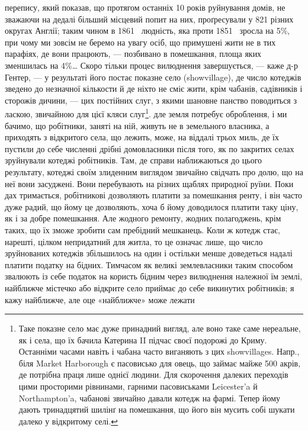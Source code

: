 перепису, який показав, що протягом останніх 10 років руйнування
домів, не зважаючи на дедалі більший місцевий попит на
них, проґресували у 821 різних округах Англії; таким чином в
1861~ людність, яка проти 1851~ зросла на 5\%, при чому
ми зовсім не беремо на увагу осіб, що примушені жити не в тих
парафіях, де вони працюють, — позбивано в помешкання, площа
яких зменшилась на 4\%\dots{} Скоро тільки процес вилюднення
завершується, — каже д-р Гентер, — у результаті його постає
показне село (showvillage), де число котеджів зведено до незначної
кількости й де ніхто не сміє жити, крім чабанів, садівників
і сторожів дичини, — цих постійних слуг, з якими шановне панство
поводиться з ласкою, звичайною для цієї кляси слуг\footnote{
Таке показне село має дуже принадний вигляд, але воно таке
саме нереальне, як і села, що їх бачила Катерина II підчас своєї подорожі
до Криму. Останніми часами навіть і чабана часто виганяють з цих showvillages.
Напр., біля Market Harborough є пасовисько для овець, що
займає майже 500 акрів, де потрібна праця лише однієї людини. Для скорочення
далеких переходів цими просторими рівнинами, гарними пасовиськами
Leicester’a й Northampton’a, чабанові звичайно давали котедж
на фармі. Тепер йому дають тринадцятий шилінґ на помешкання, що його
він мусить собі шукати далеко у відкритому селі.
}.
дле земля потребує оброблення, і ми бачимо, що робітники,
заняті на ній, живуть не в земельного власника, а приходять з
відкритого села, що лежить, може, на віддалі трьох миль, де
їх пустили до себе численні дрібні домовласники після того, як
по закритих селах зруйнували котеджі робітників. Там, де справи
наближаються до цього результату, котеджі своїм злиденним
виглядом звичайно свідчать про долю, що на неї вони засуджені.
Вони перебувають на різних щаблях природної руїни. Поки
дах тримається, робітникові дозволяють платити за помешкання
ренту, і він часто дуже радий, що йому це дозволяють, хоча б
йому доводилося платити таку ціну, як і за добре помешкання.
Але жодного ремонту, жодних полагоджень, крім таких, що їх
зможе зробити сам пребідний мешканець. Коли ж котедж стає,
нарешті, цілком непридатний для житла, то це означає лише,
що число зруйнованих котеджів збільшилось на один і остільки
менше доведеться надалі платити податку на бідних. Тимчасом
як великі землевласники таким способом звалюють із себе податок
на користь бідним через вилюднення належної їм землі, найближче
містечко або відкрите село приймає до себе викинутих
робітників; я кажу найближче, але оце «найближче» може лежати

